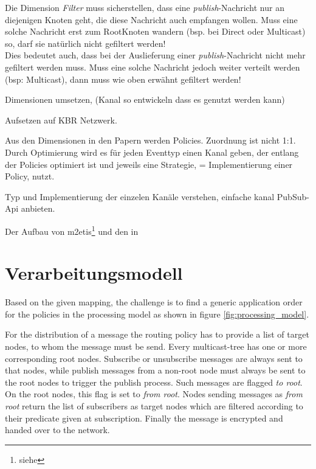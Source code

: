 Die Dimension \emph{Filter} muss sicherstellen, dass eine \emph{publish}-Nachricht nur an diejenigen Knoten geht, die diese Nachricht auch empfangen wollen. Muss eine solche Nachricht erst zum RootKnoten wandern (bsp. bei Direct oder Multicast) so, darf sie natürlich nicht gefiltert werden!\\
Dies bedeutet auch, dass bei der Auslieferung einer \emph{publish}-Nachricht nicht mehr gefiltert werden muss. Muss eine solche Nachricht jedoch weiter verteilt werden (bsp: Multicast), dann muss wie oben erwähnt gefiltert werden!


\cite{Fischer2010a, Fischer2010Event}


\cite{BeFiMu2006PubSubQoS}


Dimensionen umsetzen, (Kanal so entwickeln dass es genutzt werden kann)

Aufsetzen auf KBR Netzwerk.

Aus den Dimensionen in den Papern werden Policies. Zuordnung ist nicht 1:1. Durch Optimierung wird es für jeden Eventtyp einen Kanal geben, der entlang der Policies optimiert ist und jeweils eine Strategie, = Implementierung einer Policy, nutzt.

Typ und Implementierung der einzelen Kanäle verstehen, einfache kanal PubSub-Api anbieten.

Der Aufbau von \ac{m2etis}\footnote{siehe } und den in \cite{Fischer2010Event}




\section{Verarbeitungsmodell}

Based on the given mapping, the challenge is to find a generic application order for the policies in the processing model as shown in figure \ref{fig:processing_model}.

For the distribution of a message the routing policy has to provide a list of target nodes, to whom the message must be send. Every multicast-tree has one or more corresponding root nodes. Subscribe or unsubscribe messages are always sent to that nodes, while publish messages from a non-root node must always be sent to the root nodes to trigger the publish process. Such messages are flagged \emph{to root}. On the root nodes, this flag is set to \emph{from root}. Nodes sending messages as \emph{from root} return the list of subscribers as target nodes which are filtered according to their predicate given at subscription. Finally the message is encrypted and handed over to the network.



